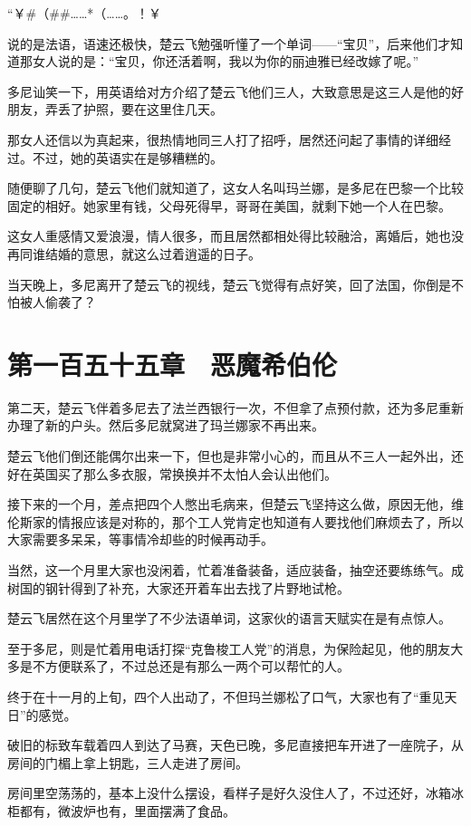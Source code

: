“￥\#（\#\#……*（……。！￥%

说的是法语，语速还极快，楚云飞勉强听懂了一个单词——“宝贝”，后来他们才知道那女人说的是：“宝贝，你还活着啊，我以为你的丽迪雅已经改嫁了呢。”

多尼讪笑一下，用英语给对方介绍了楚云飞他们三人，大致意思是这三人是他的好朋友，弄丢了护照，要在这里住几天。

那女人还信以为真起来，很热情地同三人打了招呼，居然还问起了事情的详细经过。不过，她的英语实在是够糟糕的。

随便聊了几句，楚云飞他们就知道了，这女人名叫玛兰娜，是多尼在巴黎一个比较固定的相好。她家里有钱，父母死得早，哥哥在美国，就剩下她一个人在巴黎。

这女人重感情又爱浪漫，情人很多，而且居然都相处得比较融洽，离婚后，她也没再同谁结婚的意思，就这么过着逍遥的日子。

当天晚上，多尼离开了楚云飞的视线，楚云飞觉得有点好笑，回了法国，你倒是不怕被人偷袭了？

\section{第一百五十五章　恶魔希伯伦}

第二天，楚云飞伴着多尼去了法兰西银行一次，不但拿了点预付款，还为多尼重新办理了新的户头。然后多尼就窝进了玛兰娜家不再出来。

楚云飞他们倒还能偶尔出来一下，但也是非常小心的，而且从不三人一起外出，还好在英国买了那么多衣服，常换换并不太怕人会认出他们。

接下来的一个月，差点把四个人憋出毛病来，但楚云飞坚持这么做，原因无他，维伦斯家的情报应该是对称的，那个工人党肯定也知道有人要找他们麻烦去了，所以大家需要多呆呆，等事情冷却些的时候再动手。

当然，这一个月里大家也没闲着，忙着准备装备，适应装备，抽空还要练练气。成树国的钢针得到了补充，大家还开着车出去找了片野地试枪。

楚云飞居然在这个月里学了不少法语单词，这家伙的语言天赋实在是有点惊人。

至于多尼，则是忙着用电话打探“克鲁梭工人党”的消息，为保险起见，他的朋友大多是不方便联系了，不过总还是有那么一两个可以帮忙的人。

终于在十一月的上旬，四个人出动了，不但玛兰娜松了口气，大家也有了“重见天日”的感觉。

破旧的标致车载着四人到达了马赛，天色已晚，多尼直接把车开进了一座院子，从房间的门楣上拿上钥匙，三人走进了房间。

房间里空荡荡的，基本上没什么摆设，看样子是好久没住人了，不过还好，冰箱冰柜都有，微波炉也有，里面摆满了食品。

